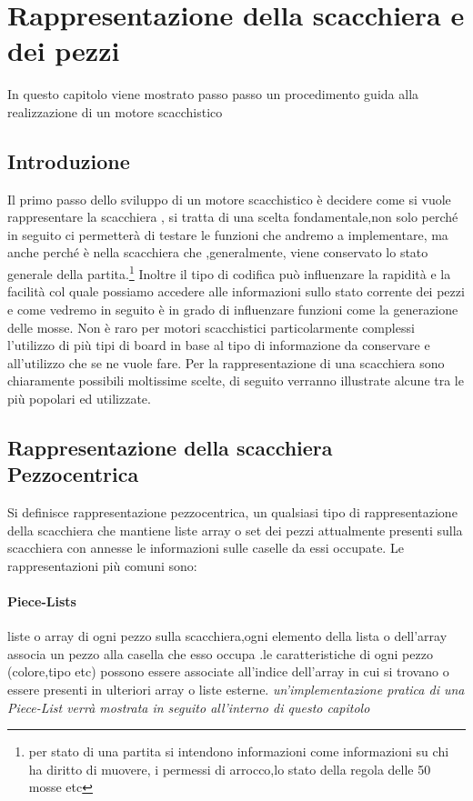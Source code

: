 \chapter{Rappresentazione della scacchiera e dei pezzi} %
%

\begin{citazione}
    In questo capitolo viene mostrato passo passo un procedimento guida alla realizzazione di un motore scacchistico
\end{citazione}

\newpage

\section{Introduzione} %
Il primo passo dello sviluppo di un motore scacchistico è decidere come si vuole rappresentare
la scacchiera , si tratta di una scelta fondamentale,non solo perché in seguito ci permetterà
di testare le funzioni che andremo a implementare, ma anche perché è nella scacchiera che ,generalmente,
viene conservato lo stato generale della partita.\footnote{per stato di una partita si intendono informazioni come
    informazioni su chi ha diritto di muovere, i permessi di arrocco,lo stato della regola delle 50 mosse etc}
Inoltre il tipo di codifica può influenzare la rapidità
e la facilità col quale possiamo accedere alle informazioni sullo stato corrente dei pezzi
e come vedremo in seguito è in grado di influenzare funzioni come la generazione delle mosse.
Non è raro per motori scacchistici particolarmente complessi l'utilizzo di più tipi di board in base
al tipo di informazione da conservare e all'utilizzo che se ne vuole fare.
Per la rappresentazione di una scacchiera sono chiaramente possibili moltissime scelte, di seguito
verranno illustrate alcune tra le più popolari ed utilizzate.

\section{Rappresentazione della scacchiera Pezzocentrica}
Si definisce rappresentazione pezzocentrica, un qualsiasi tipo di rappresentazione della scacchiera che mantiene liste
array o set dei pezzi attualmente presenti sulla scacchiera con annesse le informazioni sulle caselle da essi occupate.
Le rappresentazioni più comuni sono:
\subsubsection{Piece-Lists}
liste o array di ogni pezzo sulla scacchiera,ogni elemento della lista o dell'array associa un pezzo
alla casella che esso occupa .le caratteristiche di ogni pezzo (colore,tipo etc)
possono essere associate all'indice dell'array in cui si trovano o essere presenti in ulteriori array
o liste esterne. \emph{un'implementazione pratica di una Piece-List verrà mostrata in seguito all'interno
    di questo capitolo}

